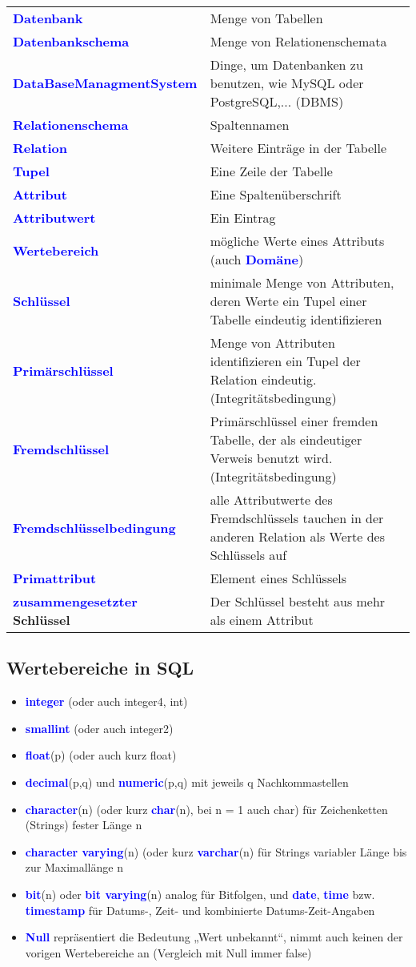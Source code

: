 \documentclass{scrartcl}
\newcommand{\key}[1]{{\textcolor{blue}{\textbf{#1}}}}
\begin{document}
\begin{tabular}{lp{12.5cm}}
	\key{Datenbank} & Menge von Tabellen\\
	\key{Datenbankschema} & Menge von Relationenschemata \\
	\key{DataBaseManagmentSystem} & Dinge, um Datenbanken zu benutzen, wie MySQL oder PostgreSQL,... (DBMS) \\
	\key{Relationenschema} & Spaltennamen\\
	\key{Relation} & Weitere Einträge in der Tabelle\\
	\key{Tupel} & Eine Zeile der Tabelle\\
	\key{Attribut}	& Eine Spaltenüberschrift\\
	\key{Attributwert} & Ein Eintrag\\
	\key{Wertebereich} & mögliche Werte eines Attributs (auch \key{Domäne}) \\
	\key{Schlüssel} & minimale Menge von Attributen, deren Werte ein Tupel einer Tabelle eindeutig identifizieren \\
	\key{Primärschlüssel} & Menge von Attributen identifizieren ein Tupel der Relation eindeutig. (Integritätsbedingung)\\
	\key{Fremdschlüssel} & Primärschlüssel einer fremden Tabelle, der als eindeutiger Verweis benutzt wird. (Integritätsbedingung) \\
	\key{Fremdschlüsselbedingung} & alle Attributwerte des Fremdschlüssels tauchen in der anderen Relation als Werte des Schlüssels auf \\
	\key{Primattribut} & Element eines Schlüssels \\
	\key{zusammengesetzter} \textbf{Schlüssel} & Der Schlüssel besteht aus mehr als einem Attribut \\
\end{tabular}

\subsection{Wertebereiche in SQL}

\begin{itemize}
	\itemsep0em
	\item \key{integer} (oder auch integer4, int)
	\item \key{smallint} (oder auch integer2)
	\item \key{float}(p) (oder auch kurz float)
	\item \key{decimal}(p,q) und \key{numeric}(p,q) mit jeweils q Nachkommastellen
	\item \key{character}(n) (oder kurz \key{char}(n), bei n = 1 auch char) für	Zeichenketten (Strings) fester Länge n
	\item \key{character varying}(n) (oder kurz \key{varchar}(n) für Strings variabler Länge bis zur Maximallänge n
	\item \key{bit}(n) oder \key{bit varying}(n) analog für Bitfolgen, und \key{date}, \key{time} bzw. \key{timestamp} für Datums-, Zeit- und kombinierte Datums-Zeit-Angaben
	\item \key{Null} repräsentiert die Bedeutung „Wert unbekannt“, nimmt auch keinen der vorigen Wertebereiche an (Vergleich mit Null immer false)
\end{itemize}
\end{document}
